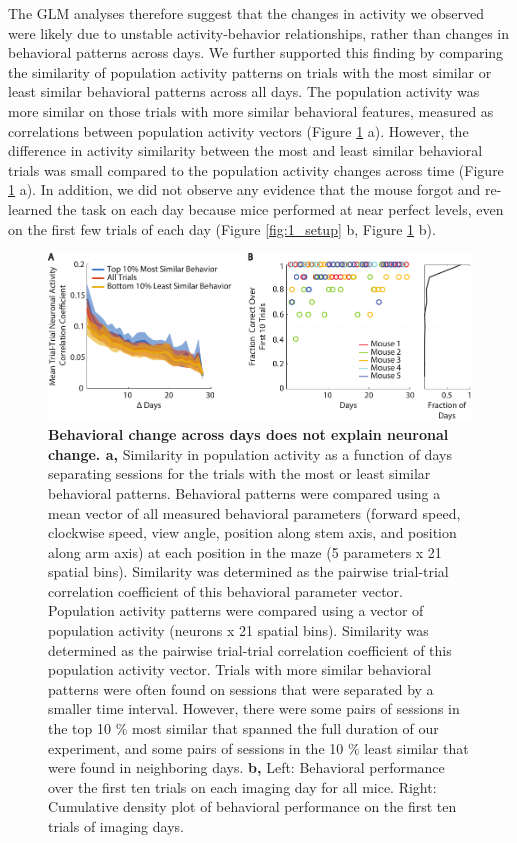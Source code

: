 \bigskip

The GLM analyses therefore suggest that the changes in activity we observed were likely due to unstable activity-behavior relationships, rather than changes in behavioral patterns across days. We further supported this finding by comparing the similarity of population activity patterns on trials with the most similar or least similar behavioral patterns across all days. The population activity was more similar on those trials with more similar behavioral features, measured as correlations between population activity vectors (Figure \ref{fig:behave_controls} a). However, the difference in activity similarity between the most and least similar behavioral trials was small compared to the population activity changes across time (Figure \ref{fig:behave_controls} a). In addition, we did not observe any evidence that the mouse forgot and re-learned the task on each day because mice performed at near perfect levels, even on the first few trials of each day (Figure \ref{fig:1_setup} b, Figure \ref{fig:behave_controls} b).

\begin{figure}
\includegraphics[width=\textwidth]{figures/behave_controls.pdf}
\caption[Behavioral change across days does not explain neuronal change.]{\textbf{Behavioral change across days does not explain neuronal change. a,} Similarity in population activity as a function of days separating sessions for the trials with the most or least similar behavioral patterns. Behavioral patterns were compared using a mean vector of all measured behavioral parameters (forward speed, clockwise speed, view angle, position along stem axis, and position along arm axis) at each position in the maze (5 parameters x 21 spatial bins). Similarity was determined as the pairwise trial-trial correlation coefficient of this behavioral parameter vector. Population activity patterns were compared using a vector of population activity (neurons x 21 spatial bins). Similarity was determined as the pairwise trial-trial correlation coefficient of this population activity vector. Trials with more similar behavioral patterns were often found on sessions that were separated by a smaller time interval. However, there were some pairs of sessions in the top 10 $\%$ most similar that spanned the full duration of our experiment, and some pairs of sessions in the 10 $\%$ least similar that were found in neighboring days. 
%
\textbf{b,} Left: Behavioral performance over the first ten trials on each imaging day for all mice. Right: Cumulative density plot of behavioral performance on the first ten trials of imaging days. 
\label{fig:behave_controls}}
\end{figure}

